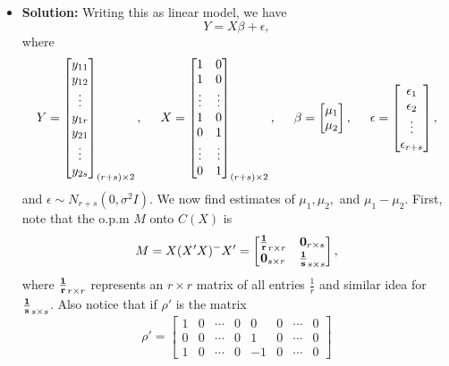 \documentclass[11pt]{article}
\begin{document}
\begin{itemize}
\item[] {\bf Solution:}  Writing this as linear model, we have
\[
Y = X\beta + \epsilon,
\]
where
\[
Y = \begin{bmatrix}
y_{11} \\ y_{12} \\ \vdots \\ y_{1r} \\ y_{21} \\ \vdots \\ y_{2s}
\end{bmatrix}_{(r+s)\times 2},\hspace{5mm} X = \begin{bmatrix}
1 & 0 \\
1 & 0 \\
\vdots & \vdots \\
1 & 0 \\ 
0 & 1 \\
\vdots & \vdots \\
0 & 1
\end{bmatrix}_{(r+s)\times 2}, \hspace{5mm} \beta = \begin{bmatrix}
\mu_1 \\ \mu_2
\end{bmatrix}, \hspace{5mm}\epsilon = \begin{bmatrix}
\epsilon_1 \\ \epsilon_2 \\ \vdots \\ \epsilon_{r+s}
\end{bmatrix},
\]
and $\epsilon \sim N_{r+s}(0,\sigma^2I)$.  We now find estimates of $\mu_1,\mu_2,$ and $\mu_1 - \mu_2$.  First, note that the o.p.m $M$ onto $C(X)$ is
\[
M = X(X'X)^-X' = \begin{bmatrix}
{\bf \frac{1}{r}}_{r\times r} & {\bf 0}_{r\times s} \\
{\bf 0}_{s\times r} & {\bf \frac{1}{s}}_{s\times s}
\end{bmatrix},
\]
where ${\bf \frac{1}{r}}_{r\times r}$ represents an $r\times r$ matrix of all entries $\frac{1}{r}$ and similar idea for ${\bf \frac{1}{s}}_{s\times s}$.  Also notice that if $\rho'$ is the matrix
\[
\rho' = \begin{bmatrix}
1 & 0 & \cdots & 0 & 0 & 0 & \cdots & 0 \\
0 & 0 & \cdots & 0 & 1 & 0 & \cdots & 0 \\
1 & 0 & \cdots & 0 & -1 & 0 &\cdots & 0

\end{bmatrix}\]
\end{itemize}
\end{document}
